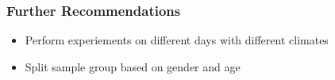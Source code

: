 \documentclass[compress,handout,10pt]{beamer}
\let\olditem\item
\renewcommand{\item}{\setlength{\itemsep}{0.5\baselineskip}\olditem}
\begin{document}
\begin{frame}
    \frametitle{Further Recommendations}
\begin{itemize}
\item Perform experiements on different days with different climates
\item Split sample group based on gender and age
\end{itemize}
\end{frame}
\end{document}
